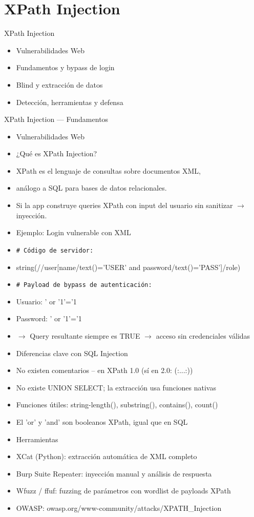 \documentclass[aspectratio=169,10pt]{beamer}
\newcommand{\cmd}[1]{\texttt{\color{uznavy}#1}}
\begin{document}
\section{XPath Injection}

\begin{frame}[allowframebreaks]{XPath Injection}
\small
  \begin{itemize}
  \item Vulnerabilidades Web
  \item Fundamentos y bypass de login
  \item Blind y extracción de datos
  \item Detección, herramientas y defensa
  \end{itemize}
\end{frame}

\begin{frame}[allowframebreaks]{XPath Injection --- Fundamentos}
\small
  \begin{itemize}
  \item Vulnerabilidades Web
  \item ¿Qué es XPath Injection?
  \item XPath es el lenguaje de consultas sobre documentos XML,
  \item análogo a SQL para bases de datos relacionales.
  \item Si la app construye queries XPath con input del usuario sin sanitizar $\rightarrow$ inyección.
  \item Ejemplo: Login vulnerable con XML
  \item \cmd{\# Código de servidor:}
  \item string(//user[name/text()='USER' and password/text()='PASS']/role)
  \item \cmd{\# Payload de bypass de autenticación:}
  \item Usuario: ' or '1'='1
  \item Password: ' or '1'='1
  \item $\rightarrow$ Query resultante siempre es TRUE $\rightarrow$ acceso sin credenciales válidas
  \item Diferencias clave con SQL Injection
  \item No existen comentarios -- en XPath 1.0 (sí en 2.0: (:...:))
  \item No existe UNION SELECT; la extracción usa funciones nativas
  \item Funciones útiles: string-length(), substring(), contains(), count()
  \item El 'or' y 'and' son booleanos XPath, igual que en SQL
  \item Herramientas
  \item XCat (Python): extracción automática de XML completo
  \item Burp Suite Repeater: inyección manual y análisis de respuesta
  \item Wfuzz / ffuf: fuzzing de parámetros con wordlist de payloads XPath
  \item OWASP: owasp.org/www-community/attacks/XPATH\_Injection
  \end{itemize}
\end{frame}
\end{document}
